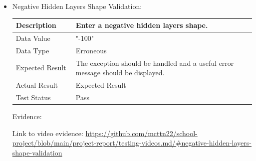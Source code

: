 \documentclass[./project-report/src/latex/project-report.tex]{subfiles}
\begin{document}
\begin{itemize}
\begin{itemize}
        \item Negative Hidden Layers Shape Validation: \newline\newline
			\begin{tabular}{|p{0.25\linewidth}|p{0.75\linewidth}|}
				\hline
				Description & Enter a negative hidden layers shape. \\
				\hline
				Data Value & "-100" \\
				\hline
				Data Type & Erroneous \\
				\hline
				Expected Result & The exception should be handled and a useful error message should be displayed. \\
				\hline
				Actual Result & Expected Result \\
				\hline
				Test Status & Pass \\
				\hline
			\end{tabular}

			\vspace{5mm}

			Evidence:
			\begin{figure}[h!]
			\centering
			\end{figure}

			\begin{sloppypar}
			Link to video evidence: \url{https://github.com/mcttn22/school-project/blob/main/project-report/testing-videos.md/#negative-hidden-layers-shape-validation}
			\end{sloppypar}

		\pagebreak


\end{itemize}
\end{itemize}
\end{document}
